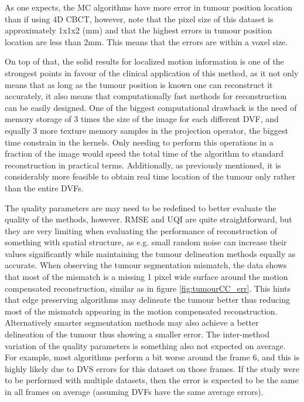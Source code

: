 As one expects, the MC algorithms have more error in tumour position location than if using 4D CBCT, however, note that the pixel size of this dataset is approximately 1x1x2 (mm) and that the highest errors in tumour position location are less than 2mm. This means that the errors are within a voxel size.
 
On top of that, the solid results for localized motion information is one of the strongest points in favour of the clinical application of this method, as it not only means that as long as the tumour position is known one can reconstruct it accurately, it also means that computationally fast methods for reconstruction can be easily designed. One of the biggest computational drawback is the need of memory storage of 3 times the size of the image for each different DVF, and equally 3 more texture memory samples in the projection operator, the biggest time constrain in the kernels. Only needing to perform this operations in a fraction of the image would speed the total time of the algorithm to  standard reconstruction in practical terms. Additionally, as previously mentioned, it is considerably more feasible to obtain real time location of the tumour only rather than the entire DVFs. 

The quality parameters are may need to be redefined to better evaluate the quality of the methods, however. RMSE and UQI are quite straightforward, but they are very limiting when evaluating the performance of reconstruction of something with spatial structure, as e.g. small random noise can increase their values significantly while maintaining the tumour delineation methods equally as accurate. When observing the tumour segmentation mismatch, the data shows that most of the mismatch is a missing 1 pixel wide surface around the motion compensated reconstruction, similar as in figure \ref{fig:tumourCC_err}. This hints that edge preserving algorithms may delineate the tumour better thus reducing most of the mismatch appearing in the motion compensated reconstruction. Alternatively smarter segmentation methods may also achieve a better delineation of the tumour thus showing a smaller error. The inter-method variation of the quality parameters is something also not expected on average. For example, most algorithms perform a bit worse around the frame 6, and this is highly likely due to DVS errors for this dataset on those frames. If the study were to be performed with multiple datasets, then the error is expected to be the same in all frames on average (assuming DVFs have the same average errors). 

